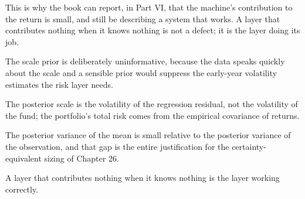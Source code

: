 This is why the book can report, in Part VI, that the machine's
contribution to the return is small, and still be describing a system that
works. A layer that contributes nothing when it knows nothing is not a
defect; it is the layer doing its job.

\begin{keytakeaways}
\item The scale prior is deliberately uninformative, because the data
speaks quickly about the scale and a sensible prior would suppress the
early-year volatility estimates the risk layer needs.
\item The posterior scale is the volatility of the regression residual,
not the volatility of the fund; the portfolio's total risk comes from the
empirical covariance of returns.
\item The posterior variance of the mean is small relative to the
posterior variance of the observation, and that gap is the entire
justification for the certainty-equivalent sizing of Chapter 26.
\item A layer that contributes nothing when it knows nothing is the layer
working correctly.
\end{keytakeaways}
